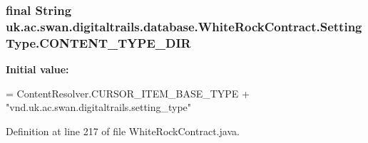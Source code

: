 \hypertarget{classuk_1_1ac_1_1swan_1_1digitaltrails_1_1database_1_1_white_rock_contract_1_1_setting_type_ac7367e46dd41f60b82a380357959fc2e}{
\subsubsection[{C\+O\+N\+T\+E\+N\+T\+\_\+\+T\+Y\+P\+E\+\_\+\+D\+I\+R}]{\setlength{\rightskip}{0pt plus 5cm}final String uk.\+ac.\+swan.\+digitaltrails.\+database.\+White\+Rock\+Contract.\+Setting\+Type.\+C\+O\+N\+T\+E\+N\+T\+\_\+\+T\+Y\+P\+E\+\_\+\+D\+I\+R\hspace{0.3cm}{\ttfamily [static]}}}\label{classuk_1_1ac_1_1swan_1_1digitaltrails_1_1database_1_1_white_rock_contract_1_1_setting_type_ac7367e46dd41f60b82a380357959fc2e}
{\bfseries Initial value\+:}
\begin{DoxyCode}
= ContentResolver.CURSOR\_ITEM\_BASE\_TYPE +
                \textcolor{stringliteral}{"vnd.uk.ac.swan.digitaltrails.setting\_type"}
\end{DoxyCode}


Definition at line 217 of file White\+Rock\+Contract.\+java.

